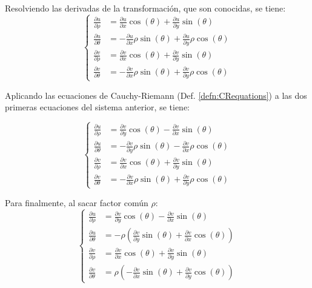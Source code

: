 \documentclass[a5paper,12pt,twoside]{book}
\begin{document}
Resolviendo las derivadas de la transformación, que son conocidas, se tiene:
\begin{equation*}
    \left\{
    \begin{aligned}
        \frac{\partial u}{\partial \rho} &= \frac{\partial u}{\partial x} \cos(\theta) + \frac{\partial u}{\partial y} \sin(\theta)
        \\[1ex]
        \frac{\partial u}{\partial \theta} &= -  \frac{\partial u}{\partial x} \rho \sin(\theta) + \frac{\partial u}{\partial y} \rho \cos(\theta)
        \\[1ex]
        \frac{\partial v}{\partial \rho} &= \frac{\partial v}{\partial x} \cos(\theta) + \frac{\partial v}{\partial y} \sin(\theta)
        \\[1ex]
        \frac{\partial v}{\partial \theta} &= - \frac{\partial v}{\partial x} \rho \sin(\theta) + \frac{\partial v}{\partial y} \rho \cos(\theta)
    \end{aligned}
    \right.
\end{equation*}

Aplicando las ecuaciones de Cauchy-Riemann (Def. \ref{defn:CRequations}) a las dos primeras ecuaciones del sistema anterior, se tiene:

\begin{equation*}
    \left\{
    \begin{aligned}
        \frac{\partial u}{\partial \rho} &= \frac{\partial v}{\partial y} \cos(\theta) - \frac{\partial v}{\partial x} \sin(\theta)
        \\[1ex]
        \frac{\partial u}{\partial \theta} &= -  \frac{\partial v}{\partial y} \rho \sin(\theta) - \frac{\partial v}{\partial x} \rho \cos(\theta)
        \\[1ex]
        \frac{\partial v}{\partial \rho} &= \frac{\partial v}{\partial x} \cos(\theta) + \frac{\partial v}{\partial y} \sin(\theta)
        \\[1ex]
        \frac{\partial v}{\partial \theta} &= -  \frac{\partial v}{\partial x} \rho \sin(\theta) + \frac{\partial v}{\partial y} \rho \cos(\theta)
    \end{aligned}
    \right.
\end{equation*}

Para finalmente, al sacar factor común $\rho$:
\begin{equation*}
    \left\{
    \begin{aligned}
        \frac{\partial u}{\partial \rho} &= \frac{\partial v}{\partial y} \cos(\theta) - \frac{\partial v}{\partial x} \sin(\theta)
        \\[1ex]
        \frac{\partial u}{\partial \theta} &= -\rho \left(  \frac{\partial v}{\partial y} \sin(\theta) + \frac{\partial v}{\partial x} \cos(\theta) \right)
        \\[1ex]
        \frac{\partial v}{\partial \rho} &= \frac{\partial v}{\partial x} \cos(\theta) + \frac{\partial v}{\partial y} \sin(\theta)
        \\[1ex]
        \frac{\partial v}{\partial \theta} &= \rho \left( -  \frac{\partial v}{\partial x} \sin(\theta) + \frac{\partial v}{\partial y} \cos(\theta) \right)
    \end{aligned}
    \right.
\end{equation*}
\end{document}
